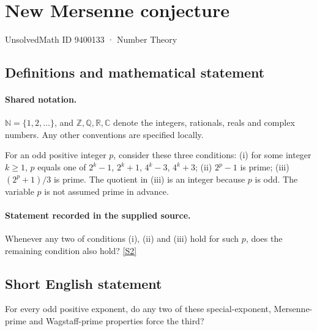 \documentclass[11pt]{article}
\newcommand{\sref}[2]{\hyperlink{source:#1:#2}{[S#2]}}
\begin{document}
\setcounter{section}{9400132}
\section{New Mersenne conjecture}\label{9400133}
{\small\sffamily UnsolvedMath ID 9400133 · Number Theory}
\subsection{Definitions and mathematical statement}

\paragraph{Shared notation.}$\mathbb N=\{1,2,\ldots\}$, and $\mathbb Z,\mathbb Q,\mathbb R,\mathbb C$ denote the integers, rationals, reals and complex numbers. Any other conventions are specified locally.


For an odd positive integer $p$, consider these three conditions: (i) for some integer $k\ge1$, $p$ equals one of $2^k-1$, $2^k+1$, $4^k-3$, $4^k+3$; (ii) $2^p-1$ is prime; (iii) $(2^p+1)/3$ is prime. The quotient in (iii) is an integer because $p$ is odd. The variable $p$ is not assumed prime in advance.
\paragraph{Statement recorded in the supplied source.}
Whenever any two of conditions (i), (ii) and (iii) hold for such $p$, does the remaining condition also hold? \sref{9400133}{2}
\subsection{Short English statement}
For every odd positive exponent, do any two of these special-exponent, Mersenne-prime and Wagstaff-prime properties force the third?
\end{document}
